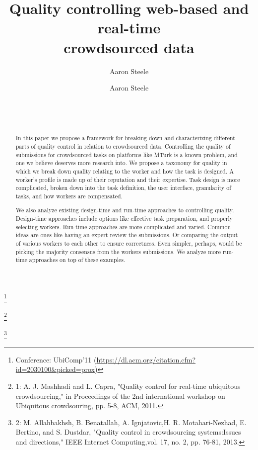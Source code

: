 \documentclass{sig-alternate-05-2015}
\title{Quality controlling web-based and real-time\\crowdsourced data}
\author{Aaron Steele}
\date{}
\author{
	\alignauthor
	Aaron Steele\\
	\affaddr{Jack Baskin School of Engineering}\\
	\affaddr{University of California Santa Cruz}\\
	\affaddr{Santa Cruz, CA}\\
	\email{atsteele@ucsc.edu}
}
\newcommand\blfootnote[1]{%
	\begingroup
	\renewcommand\thefootnote{}\footnote{#1}
	\addtocounter{footnote}{-1}
	\endgroup
}
\begin{document}
	\maketitle
	
	\blfootnote{Conference: UbiComp'11 (\url{https://dl.acm.org/citation.cfm?id=2030100&picked=prox}) }
	\blfootnote{1: A. J. Mashhadi and L. Capra, "Quality control for real-time ubiquitous crowdsourcing," in Proceedings of the 2nd international workshop on Ubiquitous crowdsouring, pp. 5-8, ACM, 2011.}
	\blfootnote{2: M. Allahbakhsh, B. Benatallah, A. Ignjatovic,H. R. Motahari-Nezhad, E. Bertino, and S. Dustdar, "Quality control in crowdsourcing systems:Issues and directions," IEEE Internet Computing,vol. 17, no. 2, pp. 76-81, 2013.}
	
	\begin{abstract}

	In this paper we propose a framework for breaking down and characterizing different parts of quality control in relation to crowdsourced data. Controlling the quality of submissions for crowdsourced tasks on platforms like MTurk is a known problem, and one we believe deserves more research into. We propose a taxonomy for quality in which we break down quality relating to the worker and how the task is designed. A worker's profile is made up of their reputation and their expertise. Task design is more complicated, broken down into the task definition, the user interface, granularity of tasks, and how workers are compensated. 
	
	We also analyze existing design-time and run-time approaches to controlling quality. Design-time approaches include options like effective task preparation, and properly selecting workers. Run-time approaches are more complicated and varied. Common ideas are ones like having an expert review the submissions. Or comparing the output of various workers to each other to ensure correctness. Even simpler, perhaps, would be picking the majority consensus from the workers submissions. We analyze more run-time approaches on top of these examples.
	

\end{abstract}
\end{document}

